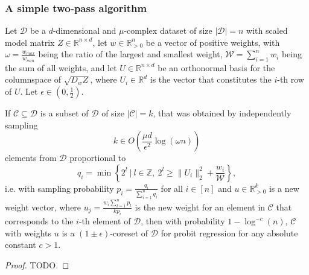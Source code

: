 

\subsubsection{A simple two-pass algorithm}

\begin{theorem}
    Let $\mathcal{D}$ be a $d$-dimensional and $\mu$-complex dataset of
    size $|\mathcal{D}|=n$ with scaled model matrix
    $Z \in \mathbb{R}^{n \times d}$, let $w \in \mathbb{R}^n_{>0}$ be
    a vector of positive weights, with
    $\omega = \frac{w_{max}}{w_{min}}$ being the ratio of the largest and
    smallest weight, $\mathcal{W} = \sum_{i=1}^n w_i$ being the
    sum of all weights, and let $U \in \mathbb{R}^{n \times d}$
    be an orthonormal basis for the columnspace of
    $\sqrt{D_wZ}$, where $U_i \in \mathbb{R}^d$ is the vector that
    constitutes the $i$-th row of $U$. Let
    $\epsilon \in (0, \frac{1}{2})$.

    If $\mathcal{C} \subseteq \mathcal{D}$ is a subset of $\mathcal{D}$
    of size $|\mathcal{C}| = k$, that was obtained by independently sampling
    \begin{equation*}
        k \in O\left(\frac{\mu d}{\epsilon^2} \log(\omega n)\right)
    \end{equation*}
    elements from $\mathcal{D}$ proportional to
    \begin{equation*}
        q_i = \min\left\{ 2^l\ |\ l \in \mathbb{Z},\  2^l \geq \lVert U_i \rVert_2^2 + \frac{w_i}{\mathcal{W}} \right\},
    \end{equation*}
    i.e. with sampling probability $p_i = \frac{q_i}{\sum_{i=1}^n q_i}$
    for all $i \in [n]$ and
    $u \in \mathbb{R}^k_{>0}$ is a new weight vector, where
    $u_j = \frac{w_i \sum_{l=1}^n p_l}{kp_i}$ is the new weight for
    an element in $\mathcal{C}$ that corresponds to the $i$-th element
    of $\mathcal{D}$,
    then with probability $1 - \log^{-c}(n)$, $\mathcal{C}$ with weights $u$
    is a $(1 \pm \epsilon)$-coreset of $\mathcal{D}$ for probit regression
    for any absolute constant $c > 1$.
\end{theorem}
\begin{proof}
    TODO.
\end{proof}